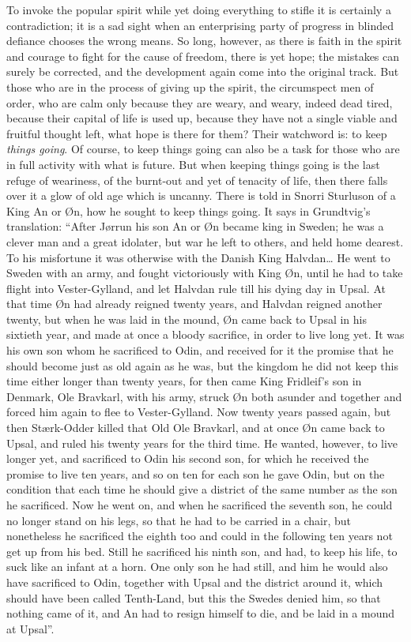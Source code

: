\documentclass[12pt,a4paper,openany]{book}
\newcommand{\opage}[1]{\marginnote{\footnotesize\textit{[#1]}}}
\begin{document}
To invoke the popular spirit while yet doing
everything to stifle it is certainly a contradiction;
it is a sad sight when an enterprising party of progress
in blinded defiance chooses the wrong means. So long,
however, as there is faith in the spirit and courage to
fight for the cause of freedom, there is yet hope; the mistakes
can surely be corrected, and the development again come into the
original track. But those who are in the process of
giving up the spirit, the circumspect men of order, who
are calm only because they are weary, and weary, indeed dead tired,
because their capital of life is used up, because they
have not a single viable and fruitful thought
left, what hope is there for them? Their watchword
is: to keep \emph{things going}. Of course, to
keep things going can also be a task for those
who are in full activity with what is future. But
when keeping things going is the last refuge of weariness, of the burnt-out
and yet of tenacity of life, then
there falls over it a glow of old age which is uncanny.
There is told in Snorri Sturluson of a King
An or Øn, how he sought to keep things going.
It says in Grundtvig's translation: ``After Jørrun
\setcounter{footnote}{0}%
\opage{69}his son An or Øn became king in Sweden; he was
a clever man and a great idolater, but war he
left to others, and held home dearest. To his
misfortune it was otherwise with the Danish
King Halvdan\dots{} He went to Sweden with an army, and
fought victoriously with King Øn, until
he had to take flight into Vester-Gylland, and let
Halvdan rule till his dying day in Upsal. At that time
Øn had already reigned twenty years, and Halvdan reigned %
another twenty, but when he was laid in the mound, Øn came
back to Upsal in his sixtieth year, and made
at once a bloody sacrifice, in order to live long yet. It
was his own son whom he sacrificed to Odin, and received for it
the promise that he should become just as old again as
he was, but the kingdom he did not keep this
time either longer than twenty years, for then came King Fridleif's
son in Denmark, Ole Bravkarl, with his army, struck
Øn both asunder and together and forced him again
to flee to Vester-Gylland. Now twenty years passed again,
but then Stærk-Odder killed that Old Ole Bravkarl,
and at once Øn came back to Upsal, and ruled
his twenty years for the third time. He wanted, however, to live
longer yet, and sacrificed to Odin his second son, for which
he received the promise to live ten years, and so on ten
for each son he gave Odin, but on the condition that
each time he should give a district of the same number
as the son he sacrificed. Now he went on, and when
he sacrificed the seventh son, he could no longer
stand on his legs, so that he had to be carried in a chair,
but nonetheless he sacrificed the eighth too and
could in the following ten years not get up from his
\setcounter{footnote}{0}%
\opage{70}bed. Still he sacrificed his ninth son, and had,
to keep his life, to suck like an infant at a horn.
One only son he had still, and him he would
also have sacrificed to Odin, together with Upsal and the district
around it, which should have been called Tenth-Land, but this
the Swedes denied him, so that nothing came of it, and
An had to resign himself to die, and be laid in a mound
at Upsal''.
\end{document}
